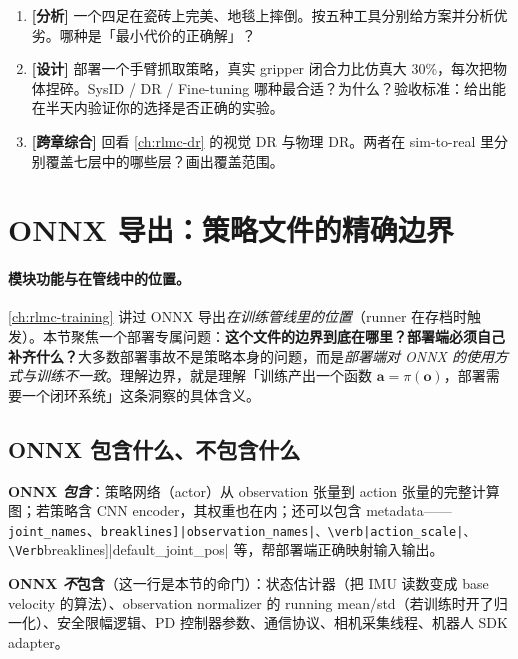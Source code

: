 \begin{practice}[工具选型]
\begin{enumerate}
  \item \textbf{[分析]} 一个四足在瓷砖上完美、地毯上摔倒。按五种工具分别给方案并分析优劣。哪种是「最小代价的正确解」？
  \item \textbf{[设计]} 部署一个手臂抓取策略，真实 gripper 闭合力比仿真大 30\%，每次把物体捏碎。SysID / DR / Fine-tuning 哪种最合适？为什么？验收标准：给出能在半天内验证你的选择是否正确的实验。
  \item \textbf{[跨章综合]} 回看 \cref{ch:rlmc-dr} 的视觉 DR 与物理 DR。两者在 sim-to-real 里分别覆盖七层中的哪些层？画出覆盖范围。
\end{enumerate}
\end{practice}

\section{ONNX 导出：策略文件的精确边界}
\label{sec:rlmc-s2r-onnx}

\paragraph{模块功能与在管线中的位置。}\cref{ch:rlmc-training} 讲过 ONNX 导出\emph{在训练管线里的位置}（runner 在存档时触发）。本节聚焦一个部署专属问题：\textbf{这个文件的边界到底在哪里？部署端必须自己补齐什么？}大多数部署事故不是策略本身的问题，而是\emph{部署端对 ONNX 的使用方式与训练不一致}。理解边界，就是理解「训练产出一个函数 $\mathbf a=\pi(\mathbf o)$，部署需要一个闭环系统」这条洞察的具体含义。

\subsection{ONNX 包含什么、不包含什么}
\label{sec:rlmc-s2r-onnx-boundary}

\textbf{ONNX \emph{包含}}：策略网络（actor）从 observation 张量到 action 张量的完整计算图；若策略含 CNN encoder，其权重也在内；还可以包含 metadata——\verb|joint_names|、\Verb[breaklines]|observation_names|、\verb|action_scale|、\Verb[breaklines]|default_joint_pos| 等，帮部署端正确映射输入输出。

\textbf{ONNX \emph{不}包含}（这一行是本节的命门）：状态估计器（把 IMU 读数变成 base velocity 的算法）、observation normalizer 的 running mean/std（若训练时开了归一化）、安全限幅逻辑、PD 控制器参数、通信协议、相机采集线程、机器人 SDK adapter。

